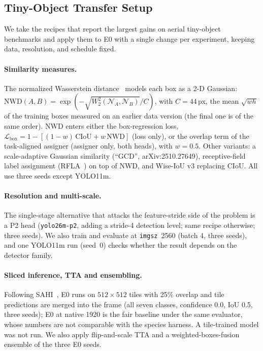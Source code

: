 \subsection{Tiny-Object Transfer Setup}
\label{sec:method:tiny}

We take the recipes that report the largest gains on aerial tiny-object benchmarks and apply them to E0 with a single change per experiment, keeping data, resolution, and schedule fixed.

\paragraph{Similarity measures.}
The normalized Wasserstein distance~\cite{wang2021nwd} models each box as a 2-D Gaussian: $\mathrm{NWD}(A,B)=\exp(-\sqrt{W_2^2(\mathcal{N}_A,\mathcal{N}_B)}/C)$, with $C=44$\,px, the mean $\sqrt{wh}$ of the training boxes measured on an earlier data version (the final one is of the same order). NWD enters either the box-regression loss, $\mathcal{L}_{\text{box}} = 1-[(1-w)\,\mathrm{CIoU} + w\,\mathrm{NWD}]$ (loss only), or the overlap term of the task-aligned assigner (assigner only, both heads), with $w=0.5$. Other variants: a scale-adaptive Gaussian similarity (``GCD'', arXiv:2510.27649), receptive-field label assignment (RFLA~\cite{xu2022rfla}) on top of NWD, and Wise-IoU v3 replacing CIoU. All use three seeds except YOLO11m.

\paragraph{Resolution and multi-scale.}
The single-stage alternative that attacks the feature-stride side of the problem is a P2 head (\texttt{yolo26m-p2}, adding a stride-4 detection level; same recipe otherwise; three seeds). We also train and evaluate at \texttt{imgsz}~2560 (batch 4, three seeds), and one YOLO11m run (seed~0) checks whether the result depends on the detector family.

\paragraph{Sliced inference, TTA and ensembling.}
Following SAHI~\cite{akyon2022sahi}, E0 runs on $512\times512$ tiles with 25\% overlap and tile predictions are merged into the frame (all seven classes, confidence 0.0, IoU 0.5, three seeds); E0 at native 1920 is the fair baseline under the same evaluator, whose numbers are not comparable with the species harness. A tile-trained model was not run. We also apply flip-and-scale TTA and a weighted-boxes-fusion ensemble of the three E0 seeds.

